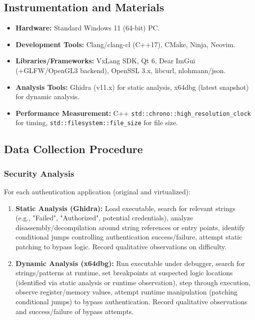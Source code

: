 \subsection{Instrumentation and Materials}
\begin{itemize}
    \item \textbf{Hardware:} Standard Windows 11 (64-bit) PC.
    \item \textbf{Development Tools:} Clang/clang-cl (C++17), CMake, Ninja, Neovim.
    \item \textbf{Libraries/Frameworks:} VxLang SDK, Qt 6, Dear ImGui (+GLFW/OpenGL3 backend), OpenSSL 3.x, libcurl, nlohmann/json.
    \item \textbf{Analysis Tools:} Ghidra (v11.x) for static analysis, x64dbg (latest snapshot) for dynamic analysis.
    \item \textbf{Performance Measurement:} C++ \texttt{std::chrono::high\_resolution\_clock} for timing, \texttt{std::filesystem::file\_size} for file size.
\end{itemize}


\subsection{Data Collection Procedure}

\subsubsection{Security Analysis}
For each authentication application (original and virtualized):
    \begin{enumerate}
        \item \textbf{Static Analysis (Ghidra):} Load executable, search for relevant strings (e.g., "Failed", "Authorized", potential credentials), analyze disassembly/decompilation around string references or entry points, identify conditional jumps controlling authentication success/failure, attempt static patching to bypass logic. Record qualitative observations on difficulty.
        \item \textbf{Dynamic Analysis (x64dbg):} Run executable under debugger, search for strings/patterns at runtime, set breakpoints at suspected logic locations (identified via static analysis or runtime observation), step through execution, observe register/memory values, attempt runtime manipulation (patching conditional jumps) to bypass authentication. Record qualitative observations and success/failure of bypass attempts.
    \end{enumerate}

